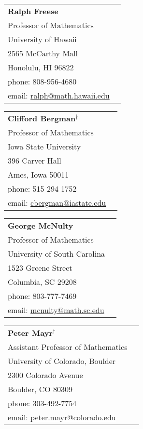 
\newcommand\referee[7]{\textbf{#1} \\ #2  \\#3  \\#4  \\#5 \\phone: #6 \\ email: \url{#7}}

{\small
    \begin{tabular}{@{}p{6cm}p{6cm}}
      \referee
          {Ralph Freese}
          {Professor of Mathematics}
          {University of Hawaii}
          {2565 McCarthy Mall}
          {Honolulu, HI 96822}
          {808-956-4680}
          {ralph@math.hawaii.edu}
    \end{tabular}
    \begin{tabular}{@{}p{6cm}p{6cm}}
      \referee
          {Clifford Bergman$^\dag$}
          {Professor of Mathematics}
          {Iowa State University}
          {396 Carver Hall}
          {Ames, Iowa 50011}
          {515-294-1752}
          {cbergman@iastate.edu}
    \end{tabular}

    \begin{tabular}{@{}p{6cm}p{6cm}}
      \referee
          {George McNulty}
          {Professor of Mathematics}
          {University of South Carolina}
          {1523 Greene Street}
          {Columbia, SC 29208}
          {803-777-7469}
          {mcnulty@math.sc.edu}
    \end{tabular}
    \begin{tabular}{@{}p{6cm}p{6cm}}
      \referee
          {Peter Mayr$^\dag$}
          {Assistant Professor of Mathematics}
          {University of Colorado, Boulder}
          {2300 Colorado Avenue}
          {Boulder, CO 80309}
          {303-492-7754} 
          {peter.mayr@colorado.edu}
    \end{tabular}

}
